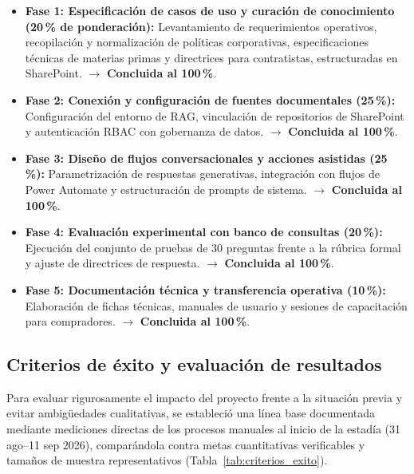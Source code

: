 \begin{itemize}
    \item \textbf{Fase 1: Especificación de casos de uso y curación de conocimiento (20\,\% de ponderación):} Levantamiento de requerimientos operativos, recopilación y normalización de políticas corporativas, especificaciones técnicas de materias primas y directrices para contratistas, estructuradas en SharePoint. $\rightarrow$ \textbf{Concluida al 100\,\%}.
    \item \textbf{Fase 2: Conexión y configuración de fuentes documentales (25\,\%):} Configuración del entorno de RAG, vinculación de repositorios de SharePoint y autenticación RBAC con gobernanza de datos. $\rightarrow$ \textbf{Concluida al 100\,\%}.
    \item \textbf{Fase 3: Diseño de flujos conversacionales y acciones asistidas (25\,\%):} Parametrización de respuestas generativas, integración con flujos de Power Automate y estructuración de prompts de sistema. $\rightarrow$ \textbf{Concluida al 100\,\%}.
    \item \textbf{Fase 4: Evaluación experimental con banco de consultas (20\,\%):} Ejecución del conjunto de pruebas de 30 preguntas frente a la rúbrica formal y ajuste de directrices de respuesta. $\rightarrow$ \textbf{Concluida al 100\,\%}.
    \item \textbf{Fase 5: Documentación técnica y transferencia operativa (10\,\%):} Elaboración de fichas técnicas, manuales de usuario y sesiones de capacitación para compradores. $\rightarrow$ \textbf{Concluida al 100\,\%}.
\end{itemize}

\subsection{Criterios de éxito y evaluación de resultados}

Para evaluar rigurosamente el impacto del proyecto frente a la situación previa y evitar ambigüedades cualitativas, se estableció una línea base documentada mediante mediciones directas de los procesos manuales al inicio de la estadía (31 ago--11 sep 2026), comparándola contra metas cuantitativas verificables y tamaños de muestra representativos (Tabla~\ref{tab:criterios_exito}).

